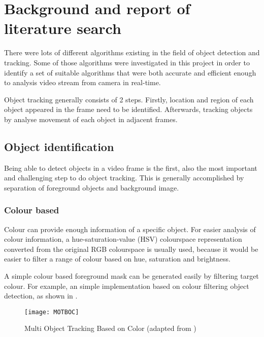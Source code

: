 \chapter{Background and report of literature search}

There were lots of different algorithms existing in the field of object detection and tracking. Some of those algorithms were investigated in this project in order to identify a set of suitable algorithms that were both accurate and efficient enough to analysis video stream from camera in real-time.

Object tracking generally consists of 2 steps. Firstly, location and region of each object appeared in the frame need to be identified. Afterwards, tracking objects by analyse movement of each object in adjacent frames.

\section{Object identification}

Being able to detect objects in a video frame is the first, also the most important and challenging step to do object tracking. This is generally accomplished by separation of foreground objects and background image.

\subsection{Colour based}
\label{bgs:colour}

Colour can provide enough information of a specific object. For easier analysis of colour information, a hue-saturation-value (HSV) colourspace \cite[p.~301]{colourspace} representation converted from the original RGB colourspace is usually used, because it would be easier to filter a range of colour based on hue, saturation and brightness.

A simple colour based foreground mask can be generated easily by filtering target colour. For example, an simple implementation \cite{MOTBOC.git} based on colour filtering object detection, as shown in .

\begin{figure}[H]
  \centering
  \texttt{[image: MOTBOC]}
  \caption{Multi Object Tracking Based on Color (adapted from \cite{MOTBOC.git})}
  \label{Figure:MOTBOC}
\end{figure}


